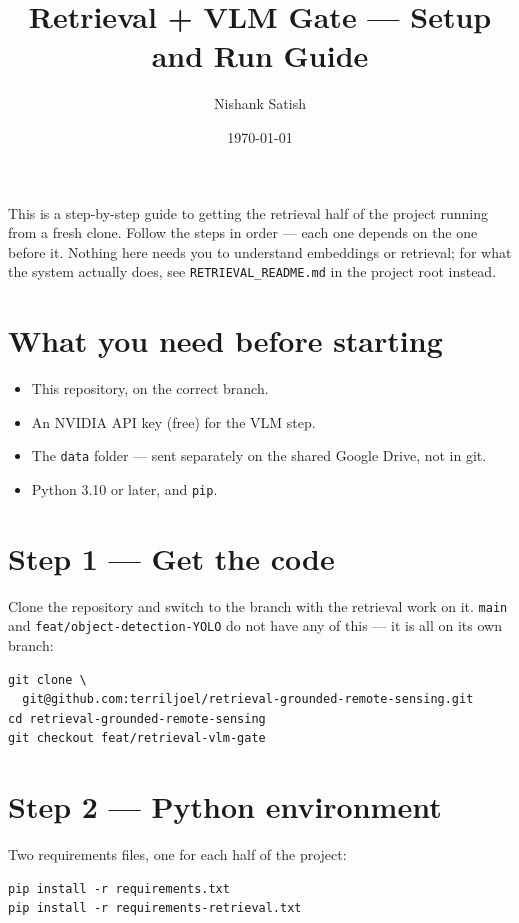 \documentclass[11pt,a4paper]{article}
\title{Retrieval + VLM Gate --- Setup and Run Guide}
\author{Nishank Satish}
\date{\today}
\begin{document}
\maketitle

This is a step-by-step guide to getting the retrieval half of the project
running from a fresh clone. Follow the steps in order --- each one depends
on the one before it. Nothing here needs you to understand embeddings or
retrieval; for what the system actually does, see \texttt{RETRIEVAL\_README.md}
in the project root instead.

\section{What you need before starting}

\begin{itemize}[nosep]
  \item This repository, on the correct branch.
  \item An NVIDIA API key (free) for the VLM step.
  \item The \texttt{data} folder --- sent separately on the shared Google
    Drive, not in git.
  \item Python 3.10 or later, and \texttt{pip}.
\end{itemize}

\section{Step 1 --- Get the code}

Clone the repository and switch to the branch with the retrieval work on
it. \texttt{main} and \texttt{feat/object-detection-YOLO} do not have any
of this --- it is all on its own branch:

\begin{verbatim}
git clone \
  git@github.com:terriljoel/retrieval-grounded-remote-sensing.git
cd retrieval-grounded-remote-sensing
git checkout feat/retrieval-vlm-gate
\end{verbatim}

\section{Step 2 --- Python environment}

Two requirements files, one for each half of the project:

\begin{verbatim}
pip install -r requirements.txt
pip install -r requirements-retrieval.txt
\end{verbatim}
\end{document}
